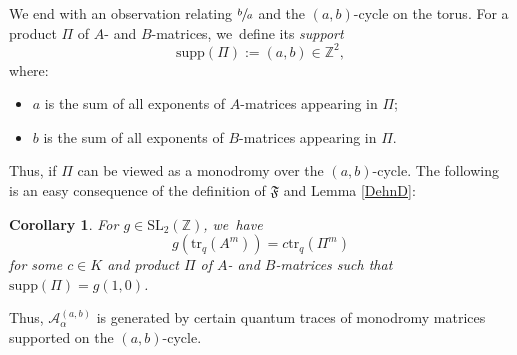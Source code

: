 \documentclass[JEP,XML,SOM,Unicode,published]{cedram}
\newcommand{\SL}{\mathrm{SL}}
\newtheorem{cor}[thm]{Corollary}
\theoremstyle{definition}
\newcommand{\ZZ}{\mathbb{Z}}
\newcommand{\AAA}{\mathcal{A}}
\newcommand{\tr}{\mathrm{tr}}
\begin{document}
We end with an observation relating $\sfrac{b}{a}$ and the $(a,b)$-cycle on the torus.
For a product $\Pi$ of $A$- and $B$-matrices, we~define its \textit{support}
\[
\mathrm{supp}(\Pi):=(a,b)\in\ZZ^2,
\]
where:
\begin{itemize}
\item $a$ is the sum of all exponents of $A$-matrices appearing in $\Pi$;
\item $b$ is the sum of all exponents of $B$-matrices appearing in $\Pi$.
\end{itemize}
Thus, if $\Pi$ can be viewed as a monodromy over the $(a,b)$-cycle.
The following is an easy consequence of the definition of $\mathfrak{F}$ and Lemma \ref{DehnD}:

\begin{cor}
For $g\in \SL_2(\ZZ)$, we~have
\[
g\left(\tr_q(A^m) \right)=c\tr_q(\Pi^m)
\]
for some $c\in K$ and product $\Pi$ of $A$- and $B$-matrices such that $\mathrm{supp}(\Pi)=g(1,0)$.
\end{cor}
Thus, $\AAA_\alpha^{(a,b)}$ is generated by certain quantum traces of monodromy matrices supported on the $(a,b)$-cycle.

\backmatter


\end{document}
